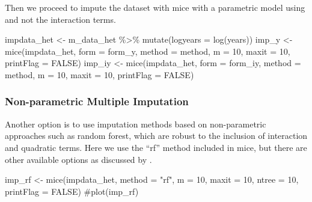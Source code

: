 \documentclass[
  letterpaper,
  DIV=11,
  numbers=noendperiod]{scrreprt}
\newenvironment{Shaded}{\begin{snugshade}}{\end{snugshade}}
\newcommand{\AttributeTok}[1]{\textcolor[rgb]{0.40,0.45,0.13}{#1}}
\newcommand{\CommentTok}[1]{\textcolor[rgb]{0.37,0.37,0.37}{#1}}
\newcommand{\ConstantTok}[1]{\textcolor[rgb]{0.56,0.35,0.01}{#1}}
\newcommand{\DecValTok}[1]{\textcolor[rgb]{0.68,0.00,0.00}{#1}}
\newcommand{\FunctionTok}[1]{\textcolor[rgb]{0.28,0.35,0.67}{#1}}
\newcommand{\NormalTok}[1]{\textcolor[rgb]{0.00,0.23,0.31}{#1}}
\newcommand{\OtherTok}[1]{\textcolor[rgb]{0.00,0.23,0.31}{#1}}
\newcommand{\SpecialCharTok}[1]{\textcolor[rgb]{0.37,0.37,0.37}{#1}}
\newcommand{\StringTok}[1]{\textcolor[rgb]{0.13,0.47,0.30}{#1}}
\begin{document}
Then we proceed to impute the dataset with mice with a parametric model
using and not the interaction terms.

\begin{Shaded}
\begin{Highlighting}[]
\NormalTok{impdata\_het }\OtherTok{\textless{}{-}}\NormalTok{  m\_data\_het }\SpecialCharTok{\%\textgreater{}\%} \FunctionTok{mutate}\NormalTok{(}\AttributeTok{logyears =} \FunctionTok{log}\NormalTok{(years))}
\NormalTok{imp\_y }\OtherTok{\textless{}{-}} \FunctionTok{mice}\NormalTok{(impdata\_het, }\AttributeTok{form =}\NormalTok{ form\_y, }\AttributeTok{method =}\NormalTok{ method, }\AttributeTok{m =} \DecValTok{10}\NormalTok{, }
              \AttributeTok{maxit =} \DecValTok{10}\NormalTok{,  }\AttributeTok{printFlag =} \ConstantTok{FALSE}\NormalTok{)}
\NormalTok{imp\_iy }\OtherTok{\textless{}{-}} \FunctionTok{mice}\NormalTok{(impdata\_het, }\AttributeTok{form =}\NormalTok{ form\_iy, }\AttributeTok{method =}\NormalTok{ method, }\AttributeTok{m =} \DecValTok{10}\NormalTok{, }
               \AttributeTok{maxit =} \DecValTok{10}\NormalTok{,  }\AttributeTok{printFlag =} \ConstantTok{FALSE}\NormalTok{)}
\end{Highlighting}
\end{Shaded}

\hypertarget{non-parametric-multiple-imputation}{%
\subsubsection{Non-parametric Multiple
Imputation}\label{non-parametric-multiple-imputation}}

Another option is to use imputation methods based on non-parametric
approaches such as random forest, which are robust to the inclusion of
interaction and quadratic terms. Here we use the ``rf'' method included
in mice, but there are other available options as discussed by
\cite{shah_comparison_2014}.

\begin{Shaded}
\begin{Highlighting}[]
\NormalTok{imp\_rf }\OtherTok{\textless{}{-}} \FunctionTok{mice}\NormalTok{(impdata\_het, }\AttributeTok{method =} \StringTok{"rf"}\NormalTok{, }\AttributeTok{m =} \DecValTok{10}\NormalTok{, }\AttributeTok{maxit =} \DecValTok{10}\NormalTok{, }
               \AttributeTok{ntree =} \DecValTok{10}\NormalTok{, }\AttributeTok{printFlag =} \ConstantTok{FALSE}\NormalTok{)}
\CommentTok{\#plot(imp\_rf)}
\end{Highlighting}
\end{Shaded}
\end{document}

